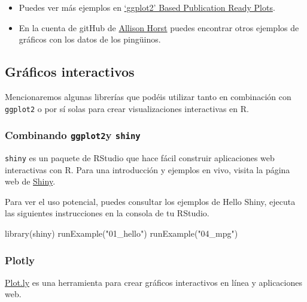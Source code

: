 \documentclass[
  letterpaper,
  DIV=11,
  numbers=noendperiod]{scrreprt}
\newenvironment{Shaded}{\begin{snugshade}}{\end{snugshade}}
\newcommand{\FunctionTok}[1]{\textcolor[rgb]{0.28,0.35,0.67}{#1}}
\newcommand{\NormalTok}[1]{\textcolor[rgb]{0.00,0.23,0.31}{#1}}
\newcommand{\StringTok}[1]{\textcolor[rgb]{0.13,0.47,0.30}{#1}}
\begin{document}
\begin{itemize}
\item
  Puedes ver más ejemplos en
  \href{https://rpkgs.datanovia.com/ggpubr/index.html}{`ggplot2' Based
  Publication Ready Plots}.
\item
  En la cuenta de gitHub de
  \href{https://allisonhorst.github.io/palmerpenguins/articles/examples.html}{Allison
  Horst} puedes encontrar otros ejemplos de gráficos con los datos de
  los pingüinos.
\end{itemize}

\subsection{Gráficos interactivos}\label{gruxe1ficos-interactivos}

Mencionaremos algunas librerías que podéis utilizar tanto en combinación
con \texttt{ggplot2} o por sí solas para crear visualizaciones
interactivas en R.

\subsubsection{\texorpdfstring{\textbf{Combinando \texttt{ggplot2}y
\texttt{shiny}}}{Combinando ggplot2y shiny}}\label{combinando-ggplot2y-shiny}

\texttt{shiny} es un paquete de RStudio que hace fácil construir
aplicaciones web interactivas con R. Para una introducción y ejemplos en
vivo, visita la página web de \href{https://shiny.rstudio.com/}{Shiny}.

Para ver el uso potencial, puedes consultar los ejemplos de Hello Shiny,
ejecuta las siguientes instrucciones en la consola de tu RStudio.

\begin{Shaded}
\begin{Highlighting}[]
\FunctionTok{library}\NormalTok{(shiny)}
\FunctionTok{runExample}\NormalTok{(}\StringTok{"01\_hello"}\NormalTok{)}
\FunctionTok{runExample}\NormalTok{(}\StringTok{"04\_mpg"}\NormalTok{)}
\end{Highlighting}
\end{Shaded}

\subsubsection{Plotly}\label{plotly}

\href{https://plotly.com/r/plotly-fundamentals/}{Plot.ly} es una
herramienta para crear gráficos interactivos en línea y aplicaciones
web.
\end{document}
